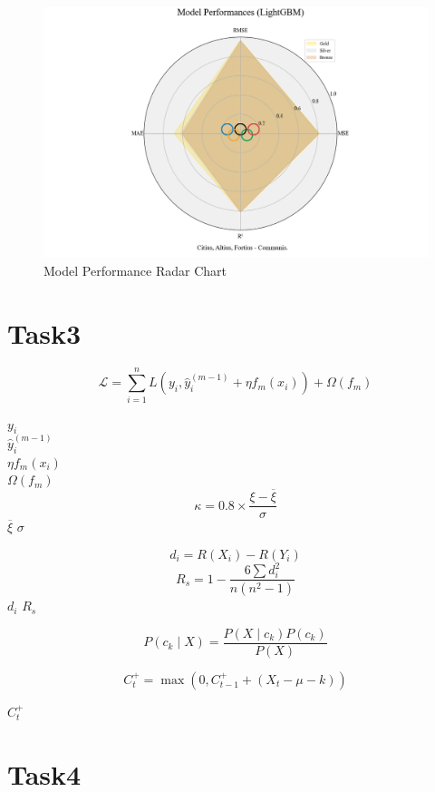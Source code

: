 \documentclass[12pt]{article}  %
\begin{document}
\begin{figure}[htbp]
	\centering
	\includegraphics[width=16cm]{img/Performance.png}
	\caption{Model Performance Radar Chart}
	\label{fig:aa}
\end{figure}








\section{Task3}


\[
\mathcal{L} = \sum_{i=1}^{n} L(y_i, \hat{y}_i^{(m-1)} + \eta f_m(x_i)) + \Omega(f_m)
\]


$y_i$\\
$\hat{y}_i^{(m-1)}$\\
$\eta f_m(x_i)$\\
$\Omega(f_m)$\\




\[
\kappa = 0.8 \times \frac{\xi - \overline{\xi}}{\sigma}
\]
$\overline{\xi}$
$\sigma$


\[
d_i = R(X_i) - R(Y_i)
\]
\[
R_s = 1 - \frac{6 \sum d_i^2}{n(n^2 - 1)}
\]
$d_i$
$R_s$


\[
P(c_k \mid X) = \frac{P(X \mid c_k) P(c_k)}{P(X)}
\]

\[
	C_t^+ = \max(0, C_{t-1}^+ + (X_t - \mu - k))
\]

$C_t^+ $
\section{Task4}
\end{document}
